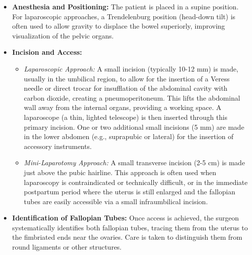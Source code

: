 \begin{itemize}
  \item \textbf{Anesthesia and Positioning:} The patient is placed in a supine position. For laparoscopic approaches, a Trendelenburg position (head-down tilt) is often used to allow gravity to displace the bowel superiorly, improving visualization of the pelvic organs.

  \item \textbf{Incision and Access:}
    \begin{itemize}
      \item \textit{Laparoscopic Approach:} A small incision (typically 10-12 mm) is made, usually in the umbilical region, to allow for the insertion of a Veress needle or direct trocar for insufflation of the abdominal cavity with carbon dioxide, creating a pneumoperitoneum. This lifts the abdominal wall away from the internal organs, providing a working space. A laparoscope (a thin, lighted telescope) is then inserted through this primary incision. One or two additional small incisions (5 mm) are made in the lower abdomen (e.g., suprapubic or lateral) for the insertion of accessory instruments.

      \item \textit{Mini-Laparotomy Approach:} A small transverse incision (2-5 cm) is made just above the pubic hairline. This approach is often used when laparoscopy is contraindicated or technically difficult, or in the immediate postpartum period where the uterus is still enlarged and the fallopian tubes are easily accessible via a small infraumbilical incision.
    \end{itemize}

  \item \textbf{Identification of Fallopian Tubes:} Once access is achieved, the surgeon systematically identifies both fallopian tubes, tracing them from the uterus to the fimbriated ends near the ovaries. Care is taken to distinguish them from round ligaments or other structures.


\end{itemize}
